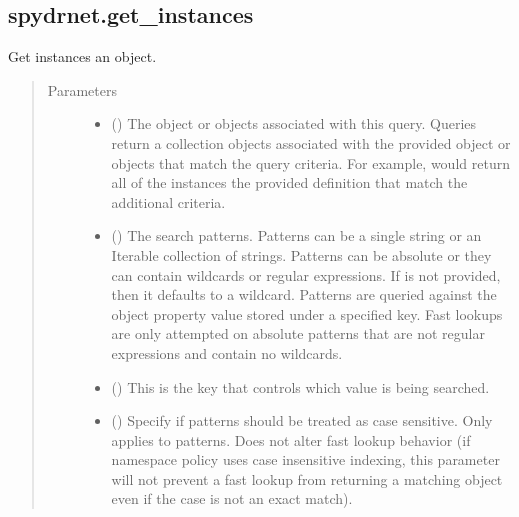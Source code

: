 \documentclass[letterpaper,10pt,english,openany,oneside]{sphinxmanual}
\begin{document}
\subsection{spydrnet.get\_instances}
\label{\detokenize{reference/classes/generated/spydrnet.get_instances:spydrnet-get-instances}}\label{\detokenize{reference/classes/generated/spydrnet.get_instances::doc}}

\begin{fulllineitems}
\label{\detokenize{reference/classes/generated/spydrnet.get_instances:spydrnet.get_instances}}
Get instances  an object.
\begin{quote}\begin{description}
\item[{Parameters}] \leavevmode\begin{itemize}
\item {} 
 () \textendash{} The object or objects associated with this query. Queries return a collection objects associated with the
provided object or objects that match the query criteria. For example,  would
return all of the instances  the provided definition that match the additional criteria.

\item {} 
 () \textendash{} The search patterns. Patterns can be a single string or an Iterable collection of strings. Patterns can be
absolute or they can contain wildcards or regular expressions. If  is not provided, then it defaults
to a wildcard. Patterns are queried against the object property value stored under a specified key. Fast lookups
are only attempted on absolute patterns that are not regular expressions and contain no wildcards.

\item {} 
 () \textendash{} This is the key that controls which value is being searched.

\item {} 
 () \textendash{} Specify if patterns should be treated as case sensitive. Only applies to patterns. Does not alter fast lookup
behavior (if namespace policy uses case insensitive indexing, this parameter will not prevent a fast lookup
from returning a matching object even if the case is not an exact match).


\end{itemize}
\end{description}
\end{quote}
\end{fulllineitems}
\end{document}
